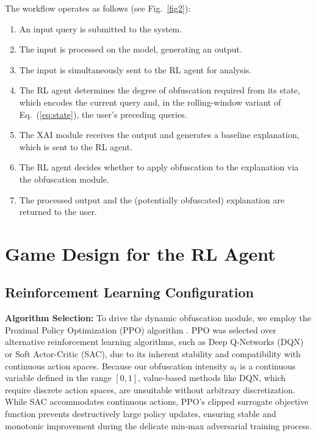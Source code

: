 \documentclass[conference]{IEEEtran}
\DeclareRobustCommand{\revnew}[1]{#1}
\begin{document}
The workflow operates as follows (see Fig.~\ref{fig2}):
\begin{enumerate}
    \item An input query is submitted to the system.
    \item The input is processed on the model, generating an output.
    \item The input is simultaneously sent to the RL agent for analysis.
    \item \revnew{The RL agent determines the degree of obfuscation required from its state, which encodes the current query and, in the rolling-window variant of Eq.~(\ref{eq:state}), the user's preceding queries.}
    \item The XAI module receives the output and generates a baseline explanation, which is sent to the RL agent.
    \item The RL agent decides whether to apply obfuscation to the explanation via the obfuscation module.
    \item The processed output and the (potentially obfuscated) explanation are returned to the user.
\end{enumerate}

\section{Game Design for the RL Agent}
\subsection{Reinforcement Learning Configuration}
\label{sec:rlconfig}

\textbf{Algorithm Selection:}
To drive the dynamic obfuscation module, we employ the Proximal Policy Optimization (PPO) algorithm \cite{b23}. PPO was selected over alternative reinforcement learning algorithms, such as Deep Q-Networks (DQN) or Soft Actor-Critic (SAC), due to its inherent stability and compatibility with continuous action spaces. Because our obfuscation intensity $a_t$ is a continuous variable defined in the range $[0, 1]$, value-based methods like DQN, which require discrete action spaces, are unsuitable without arbitrary discretization. While SAC accommodates continuous actions, PPO's clipped surrogate objective function prevents destructively large policy updates, ensuring stable and monotonic improvement during the delicate min-max adversarial training process.
\end{document}
